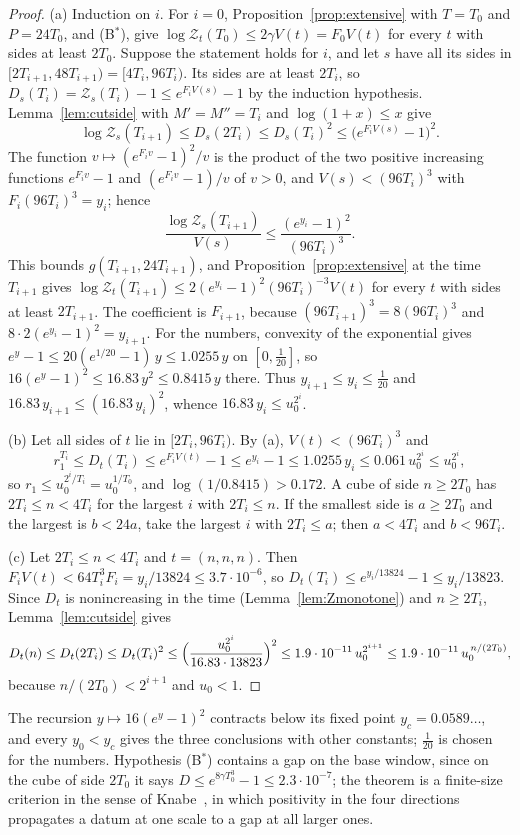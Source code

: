 \begin{proof}
(a) Induction on $i$. For $i=0$, Proposition~\ref{prop:extensive} with $T=T_0$
and $P=24T_0$, and (B$^*$), give $\log\mathcal Z_t(T_0)\le2\gamma V(t)=F_0V(t)$
for every $t$ with sides at least $2T_0$. Suppose the statement holds for
$i$, and let $s$ have all its sides in $[2T_{i+1},48T_{i+1})=[4T_i,96T_i)$.
Its sides are at least $2T_i$, so $D_s(T_i)=\mathcal Z_s(T_i)-1\le
e^{F_iV(s)}-1$ by the induction hypothesis. Lemma~\ref{lem:cutside} with
$M'=M''=T_i$ and $\log(1+x)\le x$ give
\[
\log\mathcal Z_s(T_{i+1})\le D_s(2T_i)\le D_s(T_i)^2\le\bigl(e^{F_iV(s)}-1
\bigr)^2 .
\]
The function $v\mapsto(e^{F_iv}-1)^2/v$ is the product of the two positive
increasing functions $e^{F_iv}-1$ and $(e^{F_iv}-1)/v$ of $v>0$, and $V(s)<
(96T_i)^3$ with $F_i(96T_i)^3=y_i$; hence
\[
\frac{\log\mathcal Z_s(T_{i+1})}{V(s)}\le\frac{(e^{y_i}-1)^2}{(96T_i)^3} .
\]
This bounds $g(T_{i+1},24T_{i+1})$, and Proposition~\ref{prop:extensive} at
the time $T_{i+1}$ gives $\log\mathcal Z_t(T_{i+1})\le2(e^{y_i}-1)^2(96T_i)^{-3}
V(t)$ for every $t$ with sides at least $2T_{i+1}$. The coefficient is
$F_{i+1}$, because $(96T_{i+1})^3=8(96T_i)^3$ and $8\cdot2(e^{y_i}-1)^2=
y_{i+1}$. For the numbers, convexity of the exponential gives $e^y-1\le
20(e^{1/20}-1)\,y\le1.0255\,y$ on $[0,\frac1{20}]$, so $16(e^y-1)^2\le16.83\,
y^2\le0.8415\,y$ there. Thus $y_{i+1}\le y_i\le\frac1{20}$ and $16.83\,y_{i+1}
\le(16.83\,y_i)^2$, whence $16.83\,y_i\le u_0^{2^i}$.

(b) Let all sides of $t$ lie in $[2T_i,96T_i)$. By (a), $V(t)<(96T_i)^3$
and
\[
r_1^{T_i}\le D_t(T_i)\le e^{F_iV(t)}-1\le e^{y_i}-1\le1.0255\,y_i\le0.061\,
u_0^{2^i}\le u_0^{2^i},
\]
so $r_1\le u_0^{2^i/T_i}=u_0^{1/T_0}$, and $\log(1/0.8415)>0.172$. A cube
of side $n\ge2T_0$ has $2T_i\le n<4T_i$ for the largest $i$ with $2T_i\le n$.
If the smallest side is $a\ge2T_0$ and the largest is $b<24a$, take the
largest $i$ with $2T_i\le a$; then $a<4T_i$ and $b<96T_i$.

(c) Let $2T_i\le n<4T_i$ and $t=(n,n,n)$. Then $F_iV(t)<64T_i^3F_i=y_i/13824
\le3.7\cdot10^{-6}$, so $D_t(T_i)\le e^{y_i/13824}-1\le y_i/13823$. Since
$D_t$ is nonincreasing in the time (Lemma~\ref{lem:Zmonotone}) and $n\ge
2T_i$, Lemma~\ref{lem:cutside} gives
\[
D_t(n)\le D_t(2T_i)\le D_t(T_i)^2\le\Bigl(\frac{u_0^{2^i}}{16.83\cdot13823}
\Bigr)^2\le1.9\cdot10^{-11}\,u_0^{2^{i+1}}\le1.9\cdot10^{-11}\,u_0^{\,n/(2T_0)},
\]
because $n/(2T_0)<2^{i+1}$ and $u_0<1$.
\end{proof}

The recursion $y\mapsto16(e^y-1)^2$ contracts below its fixed point $y_c=
0.0589\ldots$, and every $y_0<y_c$ gives the three conclusions with other
constants; $\frac1{20}$ is chosen for the numbers. Hypothesis (B$^*$)
contains a gap on the base window, since on the cube of side $2T_0$ it says
$D\le e^{8\gamma T_0^3}-1\le2.3\cdot10^{-7}$; the theorem is a finite-size
criterion in the sense of Knabe~\cite{Kna88}, in which positivity in the
four directions propagates a datum at one scale to a gap at all larger
ones.

